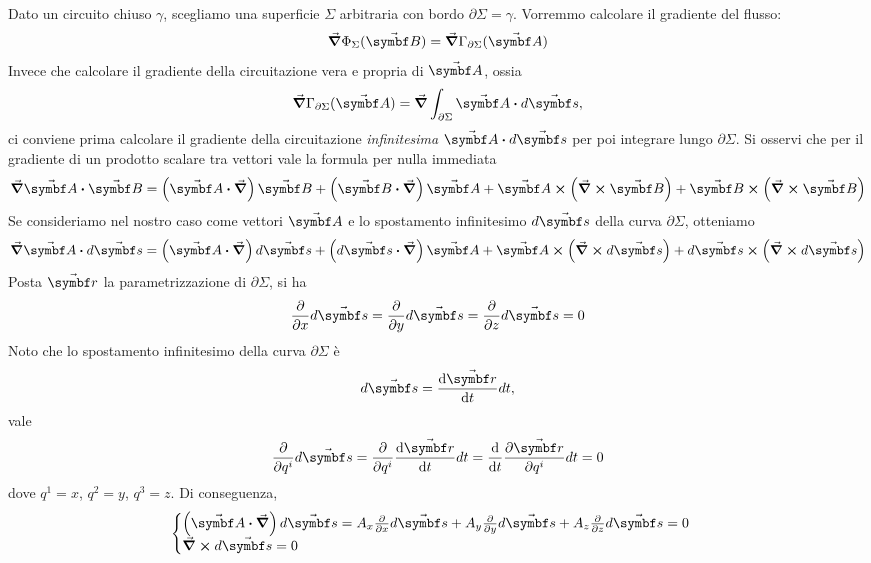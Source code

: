 Dato un circuito chiuso $\gamma$, scegliamo una superficie $\Sigma$ arbitraria con bordo $\partial \Sigma=\gamma$. Vorremmo calcolare il gradiente del flusso:
\begin{equation*}
	\grad{\Phi_\Sigma(\vba{B})}=\grad{\Gamma_{\partial\Sigma}(\vba{A})}
\end{equation*}
Invece che calcolare il gradiente della circuitazione vera e propria di $\vba{A}$, ossia
\begin{equation}
	\grad{\Gamma_{\partial\Sigma}(\vba{A})}=\grad{\int_{\partial\Sigma}\vba{A}\vdot d\vba{s}},
\end{equation}
ci conviene prima calcolare il gradiente della circuitazione \textit{infinitesima} $\vba{A}\vdot d\vba{s}$ per poi integrare lungo $\partial\Sigma$.
Si osservi che per il gradiente di un prodotto scalare tra vettori vale la formula per nulla immediata
\begin{equation}
	\grad{\vba{A}\vdot\vba{B}}=\left(\vba{A}\vdot\grad\right)\vba{B}+\left(\vba{B}\vdot\grad\right)\vba{A}+\vba{A}\cross\left(\grad\cross\vba{B}\right)+\vba{B}\cross\left(\grad\cross\vba{B}\right)
\end{equation}
Se consideriamo nel nostro caso come vettori $\vba{A}$ e lo spostamento infinitesimo $d\vba{s}$ della curva $\partial \Sigma$, otteniamo
\begin{equation*}
	\grad{\vba{A}\vdot d\vba{s}}=\left(\vba{A}\vdot\grad\right)d\vba{s}+\left(d\vba{s}\vdot\grad\right)\vba{A}+\vba{A}\cross\left(\grad\cross d\vba{s}\right)+d\vba{s}\cross\left(\grad\cross d\vba{s}\right)
\end{equation*}
Posta $\vba{r}$ la parametrizzazione di $\partial \Sigma$, si ha
\begin{equation*}
	\pdv{x} d\vba{s}=
	\pdv{y} d\vba{s}=
	\pdv{z} d\vba{s}=0
\end{equation*} %
Noto che lo spostamento infinitesimo della curva $\partial \Sigma$ è
\begin{equation*}
	d\vba{s}=\dv{\vba{r}}{t}dt,
\end{equation*}
vale
\begin{equation*}
	\pdv{q^i} d\vba{s}=
	\pdv{q^i} \dv{\vba{r}}{t}dt=
	\dv{t} \pdv{\vba{r}}{q^i}dt=0
\end{equation*}
dove $q^1=x$, $q^2=y$, $q^3=z$.
Di conseguenza,
\begin{equation*}
	\begin{cases}
		\left(\vba{A}\vdot\grad\right)d\vba{s}=A_x\pdv{x} d\vba{s}+A_y\pdv{y} d\vba{s}+A_z\pdv{z} d\vba{s}=0\\
		\curl{d\vba{s}}=0
	\end{cases}
\end{equation*} %

